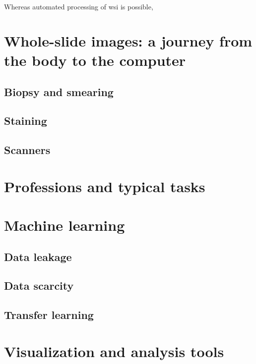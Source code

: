 Whereas automated processing of \acrshort{wsi} is possible, 

\section{Whole-slide images: a journey from the body to the computer}
\label{sec:backdp:wsi}

\parencite{mccann2014automated}

\subsection{Biopsy and smearing}
\subsection{Staining}
\subsection{Scanners}

\section{Professions and typical tasks}
\label{sec:backdp:professionandtasks}

\section{Machine learning}
\label{sec:backdp:ml}

\subsection{Data leakage}
\label{ssec:backdp:dataleakage}

\subsection{Data scarcity}
\label{ssec:backdp:datascarcity}

\subsection{Transfer learning}
\label{ssec:backdp:tl}

\parencite{van2019strategies}

\section{Visualization and analysis tools}

